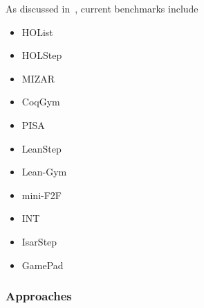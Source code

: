 \documentclass{article}
\begin{document}
    As discussed in~\cite{lu_survey_nodate}, current benchmarks include
    \begin{itemize}
        \item HOList~\cite{bansal_holist_2019}
        \item HOLStep~\cite{kaliszyk_holstep_2017}
        \item MIZAR~\cite{jakubuv_mizar_2023, grabowski_four_2015}
        \item CoqGym~\cite{yang_learning_2019}
        \item PISA~\cite{jiang_lisa_2021}
        \item LeanStep~\cite{han_proof_2021}
        \item Lean-Gym~\cite{polu_formal_2022}
        \item mini-F2F~\cite{zheng_minif2f_2021}
        \item INT~\cite{wu_int_2020}
        \item IsarStep~\cite{li_isarstep_2020}
        \item GamePad~\cite{huang_gamepad_2018}
    \end{itemize}

    \subsubsection{Approaches}

%
%
%
%
%
%
%
%
%
%
\end{document}

